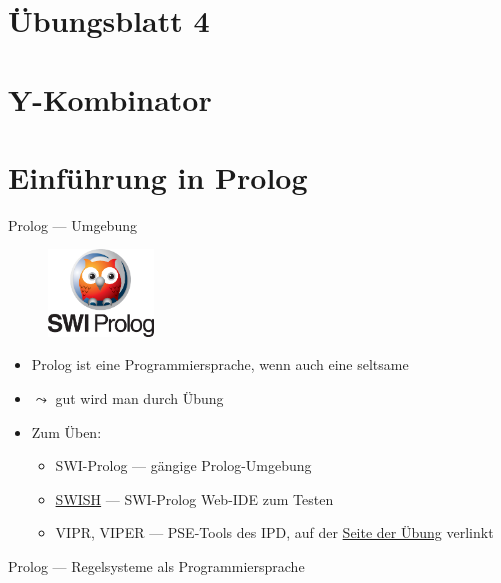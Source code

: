 \documentclass{beamer}
\begin{document}
\section{Übungsblatt 4}

\section{Y-Kombinator}

\section{Einführung in Prolog}

\begin{frame}{Prolog --- Umgebung}
  \begin{figure}
    \includegraphics[width=0.25\textwidth]{images/swipl}
  \end{figure}
	\begin{itemize}
		\item Prolog ist eine Programmiersprache, wenn auch eine seltsame
		\item $\leadsto$ gut wird man durch Übung
		\item Zum Üben:
		\begin{itemize}
			\item SWI-Prolog --- gängige Prolog-Umgebung
			\item \href{https://swish.swi-prolog.org/}{SWISH} --- SWI-Prolog Web-IDE zum Testen
			\item VIPR, VIPER --- PSE-Tools des IPD, auf der \href{https://pp.ipd.kit.edu/lehre/WS202021/paradigmen/uebung/}{Seite der Übung} verlinkt
		\end{itemize}
	\end{itemize}
\end{frame}

\begin{frame}{Prolog --- Regelsysteme als Programmiersprache}

  \vfill


\end{frame}
\end{document}

